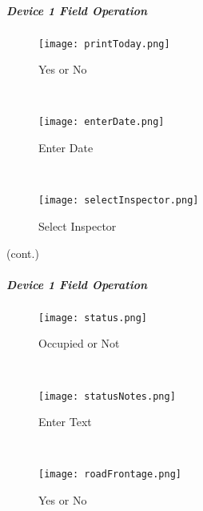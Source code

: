 \clearpage
\subparagraph*{Device 1 Field Operation}
\begin{wrapfigure}{r}{0.4\textwidth}
\centering
    \texttt{[image: printToday.png]}
\caption {Yes or No}
\vspace{.05in}

\HRule \\[.4cm] %
\vspace{.05in}

    \texttt{[image: enterDate.png]}
\caption{Enter Date}
\vspace{.05in}

\HRule \\[.4cm] %
\vspace{.05in}

    \texttt{[image: selectInspector.png]}
\caption{Select Inspector}
\end{wrapfigure}

{\footnotesize (cont.)}
\vspace{.8in}

\vspace{2in}

\vspace{3in}

\clearpage


\subparagraph*{Device 1 Field Operation}
\begin{wrapfigure}{r}{0.4\textwidth}
\centering
    \texttt{[image: status.png]}
\caption {Occupied or Not}
\vspace{.05in}

\HRule \\[.4cm] %
\vspace{.05in}

    \texttt{[image: statusNotes.png]}
\caption{Enter Text}
\vspace{.05in}

\HRule \\[.4cm] %
\vspace{.05in}

    \texttt{[image: roadFrontage.png]}
\caption{Yes or No}
\end{wrapfigure}

